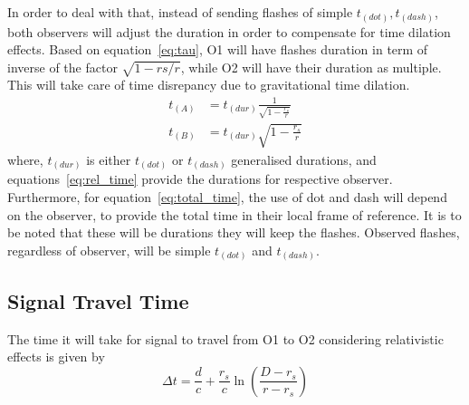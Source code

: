 In order to deal with that, instead of sending flashes of simple \(t_{(dot)}, t_{(dash)}\), both observers will adjust the duration in order to compensate for 
time dilation effects. Based on equation~\ref{eq:tau}, O1 will have flashes duration in term of inverse of the factor \(\sqrt{1 - rs/r}\), while O2 will have their duration as multiple. 
This will take care of time disrepancy due to gravitational time dilation.
\begin{align*}\label{eq:rel_time}
    t_{(A)} &= t_{(dur)} \frac{1}{\sqrt{1 - \frac{r_s}{r}}} \\
    t_{(B)} &= t_{(dur)} \sqrt{1 - \frac{r_s}{r}} \tag{3.21}
\end{align*}
where, \(t_{(dur)}\) is either \(t_{(dot)}\) or \(t_{(dash)}\) generalised durations, and equations~\ref{eq:rel_time} provide the durations for respective observer.
Furthermore, for equation~\ref{eq:total_time}, the use of dot and dash will depend on the observer, to provide the total time in their local frame of reference. It is 
to be noted that these will be durations they will keep the flashes. Observed flashes, regardless of observer, will be simple \(t_{(dot)}\) and \(t_{(dash)}\). 

\subsection{Signal Travel Time}\label{subsec:stt}

The time it will take for signal to travel from O1 to O2 considering relativistic effects is given by
\begin{equation}\label{eq:signal_time}
    \Delta t = \frac{d}{c} + \frac{r_s}{c} \ln (\frac{D - r_s}{r - r_s}) \tag{3.22}
\end{equation}

